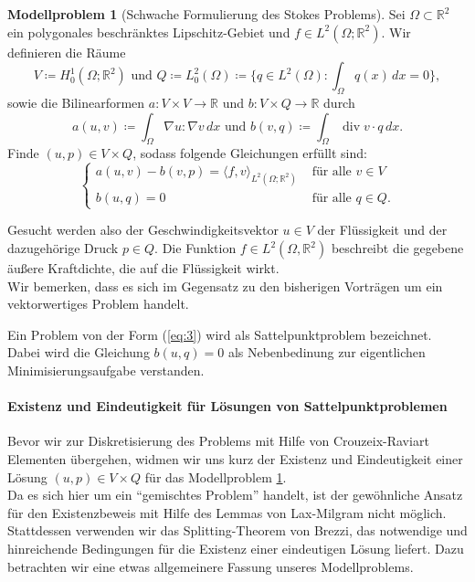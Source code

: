 \message{ !name(script.tex)}\documentclass[a4paper]{scrartcl}
\newcommand{\real}{\mathbb{R}}
\newcommand{\Hzero}{H_0^1}
\newcommand{\Ltwo}{L^2}
\newcommand{\dx}{\,dx}
\DeclareMathOperator{\divOp}{div}
\theoremstyle{plain}
\theoremstyle{definition}
\newtheorem{modellproblem}{Modellproblem}
\theoremstyle{remark}
\begin{document}
\begin{modellproblem}[Schwache Formulierung des Stokes Problems] \label{problem:1}
  Sei \(\Omega \subset \real^2\) ein polygonales beschränktes
  Lipschitz-Gebiet und \(f\in \Ltwo(\Omega; \real^2)\). Wir definieren
  die Räume 
  \[V \coloneqq \Hzero(\Omega; \real^2) \text{ und } Q \coloneqq
  \Ltwo_0(\Omega) \coloneqq \{q \in \Ltwo(\Omega): \int_\Omega q(x)
  \dx = 0\},\]
  sowie die Bilinearformen \(a \colon V\times V \rightarrow \real\)
  und \(b \colon V\times Q \rightarrow \real\) durch
  \begin{equation}
    \label{eq:2}
    a(u,v) \coloneqq \int_\Omega \nabla u : \nabla v \dx 
    \text{ und }
    b(v,q) \coloneqq \int_\Omega \divOp v \cdot q \dx. 
  \end{equation}
  Finde \((u,p) \in V\times Q\), sodass folgende Gleichungen erfüllt
  sind: 
  \begin{equation}
    \label{eq:3}
    \begin{cases}
      a(u,v) - b(v,p) = \langle f, v \rangle_{\Ltwo(\Omega;\real^2)} &
      \text{ für alle } v \in V \\
      b(u,q) = 0 & \text{ für alle } q \in Q.
    \end{cases}
  \end{equation}
\end{modellproblem}

{\color{blue}
  \noindent Gesucht werden also der Geschwindigkeitsvektor \(u \in V\) der
  Flüssigkeit und der dazugehörige Druck \(p \in Q\). Die Funktion \(f
  \in \Ltwo(\Omega, \real^2)\) beschreibt die gegebene äußere
  Kraftdichte, die auf die Flüssigkeit wirkt. \\
  Wir bemerken, dass es sich im Gegensatz zu den bisherigen Vorträgen um
  ein vektorwertiges Problem handelt. \\
}

\noindent Ein Problem von der Form (\ref{eq:3}) wird als Sattelpunktproblem
bezeichnet. Dabei wird die Gleichung \(b(u,q) = 0 \) als Nebenbedinung
zur eigentlichen Minimi\-sierungs\-aufgabe verstanden. \\ 

\paragraph{Existenz und Eindeutigkeit für Lösungen von Sattelpunktproblemen}
\label{sec:exist-und-eind}

\noindent Bevor wir zur Diskretisierung des Problems mit Hilfe von
Crouzeix-Raviart Elementen übergehen, widmen wir uns kurz der Existenz
und Eindeutigkeit einer Lösung \((u,p) \in V\times Q\) für das Modellproblem
\ref{problem:1}.\\
Da es sich hier um ein ``gemischtes Problem'' handelt, ist der
gewöhnliche Ansatz für den Existenzbeweis mit Hilfe des Lemmas von
Lax-Milgram nicht möglich. Stattdessen verwenden wir das
Splitting-Theorem von Brezzi, das notwendige und hinreichende
Bedingungen für die Existenz einer eindeutigen Lösung liefert. Dazu
betrachten wir eine etwas allgemeinere Fassung unseres Modellproblems.
\end{document}
